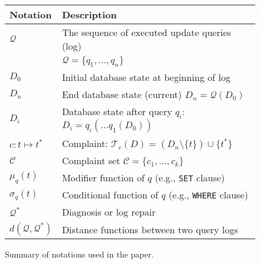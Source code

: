 
\begin{figure}[t]
\centering
{\small
\begin{tabular}{ll}
    \toprule
    \textbf{Notation} & \textbf{Description}\\
    \midrule
    $\mathcal{Q}$& The sequence of executed update queries (log)\\ 
             & $\mathcal{Q}=\{q_1, \dots, q_n\}$ \\
    $D_0$    & Initial database state at beginning of log\\
    $D_n$    & End database state (current) $D_n=\mathcal{Q}(D_0)$\\
    $D_i$    & Database state after query $q_i$: $D_i=q_i(\dots q_1(D_0))$\\
    $c: t\mapsto t^*$ & Complaint: $\mathcal{T}_c(D) = (D_n\setminus\{t\})\cup\{t^*\}$\\
    $\mathcal{C}$ & Complaint set $\mathcal{C}=\{c_1,\dots,c_k\}$\\
    $\mu_q(t)$  & Modifier function of $q$ (e.g., \texttt{SET} clause)\\
    $\sigma_q(t)$   & Conditional function of $q$ (e.g., \texttt{WHERE} clause)\\
    $\mathcal{Q}^*$& Diagnosis or log repair\\
    $d(\mathcal{Q}, \mathcal{Q}^*)$ & Distance functions between two query logs\\
    \bottomrule
\end{tabular}
}
\caption{Summary of notations used in the paper. }
\label{tbl:notation}
\end{figure}